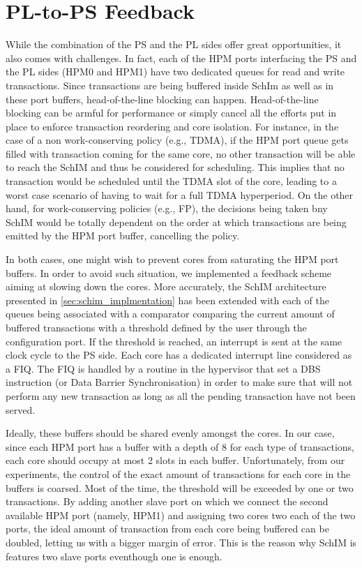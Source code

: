 \section{PL-to-PS Feedback}
    \label{sec:pl-to-ps-feedback}
    While the combination of the PS and the PL sides offer great opportunities, it also comes with challenges. In fact, each of the HPM ports interfacing the PS and the PL sides (HPM0 and HPM1) have two dedicated queues for read and write transactions. Since transactions are being buffered inside SchIm as well as in these port buffers, head-of-the-line blocking can happen. Head-of-the-line blocking can be armful for performance or simply cancel all the efforts put in place to enforce transaction reordering and core isolation. For instance, in the case of a non work-conserving policy (e.g., TDMA), if the HPM port queue gets filled with transaction coming for the same core, no other transaction will be able to reach the SchIM and thus be considered for scheduling. This implies that no transaction would be scheduled until the TDMA slot of the core, leading to a worst case scenario of having to wait for a full TDMA hyperperiod. On the other hand, for work-conserving policies (e.g., FP), the decisions being taken bny SchIM would be totally dependent on the order at which transactions are being emitted by the HPM port buffer, cancelling the policy.
    
    In both cases, one might wish to prevent cores from saturating the HPM port buffers. In order to avoid such situation, we implemented a feedback scheme aiming at slowing down the cores. More accurately, the SchIM architecture presented in \ref{sec:schim_implmentation} has been extended with each of the queues being associated with a comparator comparing the current amount of buffered transactions with a threshold defined by the user through the configuration port. If the threshold is reached, an interrupt is sent at the same clock cycle to the PS side. Each core has a dedicated interrupt line considered as a FIQ. The FIQ is handled by a routine in the hypervisor that set a DBS instruction (or Data Barrier Synchronisation) in order to make sure that will not perform any new transaction as long as all the pending transaction have not been served.
    
    Ideally, these buffers should be shared evenly amongst the cores. In our case, since each HPM port has a buffer with a depth of 8 for each type of transactions, each core should occupy at most 2 slots in each buffer. Unfortunately, from our experiments, the control of the exact amount of transactions for each core in the buffers is coarsed. Most of the time, the threshold will be exceeded by one or two transactions. By adding another slave port on which we connect the second available HPM port (namely, HPM1) and assigning two cores two each of the two ports, the ideal amount of transaction from each core being buffered can be doubled, letting us with a bigger margin of error. This is the reason why SchIM is features two slave ports eventhough one is enough.
